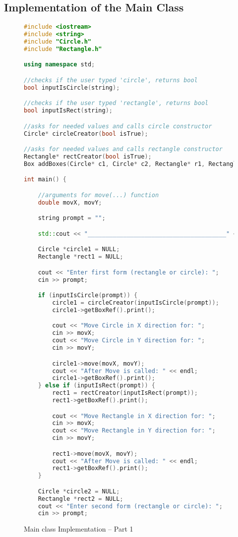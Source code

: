 \documentclass[a4paper, 10pt]{article}
\begin{document}
\subsection{Implementation of the Main Class}
\begin{figure}[H]
\begin{lstlisting}[language=c++]
#include <iostream>
#include <string>
#include "Circle.h"
#include "Rectangle.h"

using namespace std;

//checks if the user typed 'circle', returns bool
bool inputIsCircle(string);

//checks if the user typed 'rectangle', returns bool
bool inputIsRect(string);

//asks for needed values and calls circle constructor
Circle* circleCreator(bool isTrue);

//asks for needed values and calls rectangle constructor
Rectangle* rectCreator(bool isTrue);
Box addBoxes(Circle* c1, Circle* c2, Rectangle* r1, Rectangle* r2);

int main() {

	//arguments for move(...) function
	double movX, movY;

	string prompt = "";

	std::cout << "_______________________________________" << endl;

	Circle *circle1 = NULL;
	Rectangle *rect1 = NULL;

	cout << "Enter first form (rectangle or circle): ";
	cin >> prompt;

	if (inputIsCircle(prompt)) {
		circle1 = circleCreator(inputIsCircle(prompt));
		circle1->getBoxRef().print();

		cout << "Move Circle in X direction for: ";
		cin >> movX;
		cout << "Move Circle in Y direction for: ";
		cin >> movY;

		circle1->move(movX, movY);
		cout << "After Move is called: " << endl;
		circle1->getBoxRef().print();
	} else if (inputIsRect(prompt))	{
		rect1 = rectCreator(inputIsRect(prompt));
		rect1->getBoxRef().print();

		cout << "Move Rectangle in X direction for: ";
		cin >> movX;
		cout << "Move Rectangle in Y direction for: ";
		cin >> movY;

		rect1->move(movX, movY);
		cout << "After Move is called: " << endl;
		rect1->getBoxRef().print();
	}

	Circle *circle2 = NULL;
	Rectangle *rect2 = NULL;
	cout << "Enter second form (rectangle or circle): ";
	cin >> prompt;
\end{lstlisting}
\caption{Main class Implementation – Part 1}
\end{figure}
\end{document}
